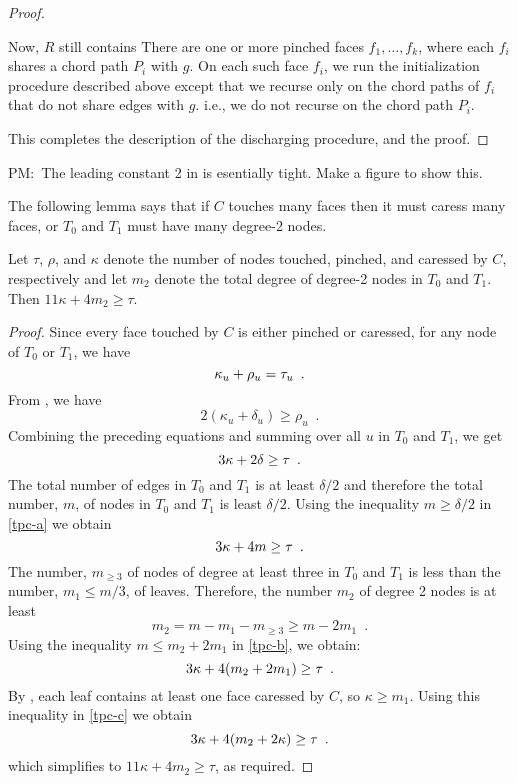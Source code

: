 \documentclass{patmorin}
\newcommand{\note}[2]{{\color{red}#1:~#2}}
\begin{document}
\begin{proof}
\begin{enumerate}
  Now, $R$ still contains There are one or more pinched faces
  $f_1,\ldots,f_k$, where each $f_i$ shares a chord path $P_i$ with $g$.
  On each such face $f_i$, we run the initialization procedure described
  above except that we recurse only on the chord paths of $f_i$ that
  do not share edges with $g$. i.e., we do not recurse on the chord
  path $P_i$.
\end{enumerate}
   This completes the description of the discharging procedure, and the proof.
\end{proof}

\note{PM}{The leading constant 2 in \lemref{many-good-or-high-degree} is esentially tight. Make a figure to show this.}

The following lemma says that if $C$ touches many faces then it must caress many faces, or $T_0$ and $T_1$ must have many degree-2 nodes.

\begin{lem}
  Let $\tau$, $\rho$, and $\kappa$ denote the number of nodes touched,
  pinched, and caressed by $C$, respectively and let $m_2$ denote the
  total degree of degree-2 nodes in $T_0$ and $T_1$.  Then $11\kappa +
  4m_2 \ge \tau$.
\end{lem}

\begin{proof}
Since every face touched by $C$ is either pinched or caressed, for any node
of $T_0$ or $T_1$, we have
\begin{equation}
     \kappa_u + \rho_u = \tau_u \enspace . \eqlabel{tpc}
\end{equation}
From , we have 
\[
    2(\kappa_u+\delta_u) \ge \rho_u \enspace .
\]
Combining the preceding equations and summing over all $u$ in $T_0$
and $T_1$, we get
\begin{equation}
     3\kappa + 2\delta \ge \tau \enspace . \eqlabel{tpc-a}
\end{equation}
The total number of edges in $T_0$
and $T_1$ is at least $\delta/2$ and therefore the total number, $m$,
of nodes in $T_0$ and $T_1$ is least $\delta/2$. Using the inequality
$m\ge \delta/2$ in \eqref{tpc-a} we obtain 
\begin{equation}
     3\kappa + 4m \ge \tau \enspace .  \eqlabel{tpc-b}
\end{equation}
The number, $m_{\ge 3}$ of nodes of degree at least three in $T_0$
and $T_1$ is less than the number, $m_1\le m/3$, of leaves.  Therefore,
the number $m_2$ of degree 2 nodes is at least
\[
   m_2 = m - m_1 - m_{\ge 3} \ge m-2m_1 \enspace .
\]
Using the inequality $m\le m_2+2m_1$  in \eqref{tpc-b}, we obtain:
\begin{equation}
     3\kappa + 4(m_2+2m_1) \ge \tau \enspace .  \eqlabel{tpc-c}
\end{equation}
By , each leaf contains at least one face caressed
by $C$, so $\kappa \ge m_1$. Using this inequality in \eqref{tpc-c} we obtain
\begin{equation}
     3\kappa + 4(m_2+2\kappa) \ge \tau \enspace .  \eqlabel{tpc-c}
\end{equation}
which simplifies to $11\kappa + 4m_2 \ge \tau$, as required.
\end{proof}




\end{document}
